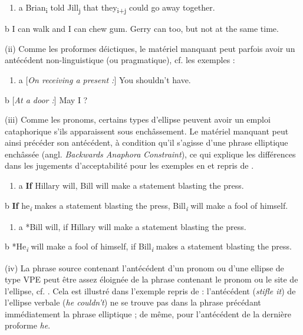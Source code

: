 \begin{enumerate}
\item \label{bkm:Ref305952265}a  Brian\textsubscript{i} told Jill\textsubscript{j} that they\textsubscript{i+j} could go away together. 


\end{enumerate}
  b  I can walk and I can chew gum. Gerry can too, but not at the same time.  

(ii) Comme les proformes déictiques, le matériel manquant peut parfois avoir un antécédent non-linguistique (ou pragmatique), cf. les exemples  :


\begin{enumerate}
\item \label{bkm:Ref305952763}a  [\textit{On receiving a present :}] You shouldn't have.


\end{enumerate}
  b  [\textit{At a door :}] May I ?  

(iii) Comme les pronoms, certains types d'ellipse peuvent avoir un emploi cataphorique s'ils apparaissent sous enchâssement. Le matériel manquant peut ainsi précéder son antécédent, à condition qu'il s'agisse d'une phrase elliptique enchâssée (angl. \textit{Backwards Anaphora} \textit{Constraint}), ce qui explique les différences dans les jugements d'acceptabilité pour les exemples en  et  repris de \citet{Kehler2000}. 


\begin{enumerate}
\item \label{bkm:Ref305953749}a  \textbf{If} Hillary will, Bill will make a statement blasting the press. 


\end{enumerate}
  b  \textbf{If} he\textit{\textsubscript{i}} makes a statement blasting the press, Bill\textit{\textsubscript{i}} will make a fool of himself.  


\begin{enumerate}
\item \label{bkm:Ref305953751}a  *Bill will, if Hillary will make a statement blasting the press. 


\end{enumerate}
  b  *He\textit{\textsubscript{i}} will make a fool of himself, if Bill\textit{\textsubscript{i}} makes a statement blasting the press.  

(iv) La phrase source contenant l'antécédent d'un pronom ou d'une ellipse de type VPE peut être assez éloignée de la phrase contenant le pronom ou le site de l'ellipse, cf. \citet{Hardt1993}. Cela est illustré dans l'exemple  repris de \citet{Kehler2000} : l'antécédent (\textit{stifle it}) de l'ellipse verbale (\textit{he couldn't}) ne se trouve pas dans la phrase précédant immédiatement la phrase elliptique ; de même, pour l'antécédent de la dernière proforme \textit{he}.


